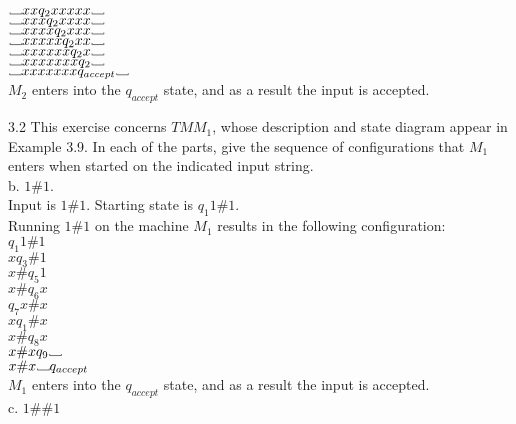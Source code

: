 \documentclass[12pt]{article}
\newcommand\Vtextvisiblespace[1][.8em]{%
	\mbox{\kern.07em\vrule height.3ex}%
	\vbox{\hrule width#1}%
	\hbox{\vrule height.3ex}}
\begin{document}
$\Vtextvisiblespace xx        q_2 xxxxx   \Vtextvisiblespace  $  \\
$\Vtextvisiblespace xxx       q_2 xxxx    \Vtextvisiblespace  $  \\
$\Vtextvisiblespace xxxx      q_2 xxx     \Vtextvisiblespace  $  \\
$\Vtextvisiblespace xxxxx     q_2 xx      \Vtextvisiblespace  $  \\
$\Vtextvisiblespace xxxxxx    q_2 x       \Vtextvisiblespace  $  \\
$\Vtextvisiblespace xxxxxxx   q_2         \Vtextvisiblespace  $  \\
$\Vtextvisiblespace xxxxxxx   q_{accept}  \Vtextvisiblespace  $  \\
$M_2$ enters into the $q_{accept}$ state, and as a result the input is accepted. \\

\pagebreak

3.2 This exercise concerns $TM M_1$, whose description and state diagram appear in 
Example 3.9. In each of the parts, give the sequence of configurations that $M_1$ 
enters when started on the indicated input string. \\

b. $1\#1$. \\

Input is $1\#1$. Starting state is $q_1 1\#1$. \\
Running $1\#1$ on the machine $M_1$ results in the following configuration: \\

$       q_1 1 \# 1  $ \\
$x      q_3 \# 1    $ \\
$x \#   q_5 1       $ \\
$x \#   q_6 x       $ \\
$       q_7 x \# x  $ \\
$x      q_1 \# x    $ \\
$x \#   q_8 x       $ \\
$x \# x q_9 \Vtextvisiblespace $ \\
$x \# x \Vtextvisiblespace q_{accept} $ \\
$M_1$ enters into the $q_{accept}$ state, and as a result the input is accepted. \\

c. $1\#\#1$ \\
\end{document}
